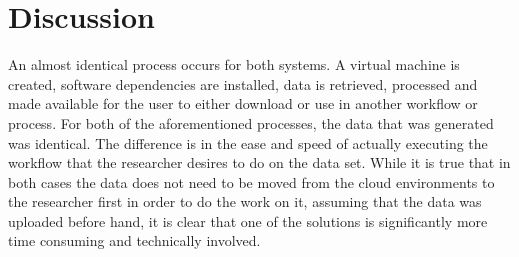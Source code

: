 \begin{table}[ht!]
\renewcommand\footnoterule{}
\caption[Step Differences between Nikeza and Amazon AWS]{The differences between steps needed to complete the work task using OpenStack with Nikeza and Amazon AWS.}
\label{tab:comparison_overview}
\end{table}

\section{Discussion}

An almost identical process occurs for both systems. A virtual machine is created, software dependencies are installed, data is retrieved, processed and made available for the user to either download or use in another workflow or process. For both of the aforementioned processes, the data that was generated was identical. The difference is in the ease and speed of actually executing the workflow that the researcher desires to do on the data set. While it is true that in both cases the data does not need to be moved from the cloud environments to the researcher first in order to do the work on it, assuming that the data was uploaded before hand, it is clear that one of the solutions is significantly more time consuming and technically involved.

